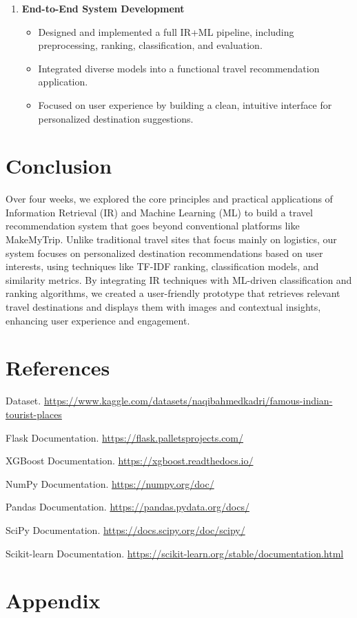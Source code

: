 \documentclass[12pt,a4paper]{report}
\begin{document}
\begin{enumerate}
    \item \textbf{End-to-End System Development}
    \begin{itemize}
        \item Designed and implemented a full IR+ML pipeline, including preprocessing, ranking, classification, and evaluation.
        \item Integrated diverse models into a functional travel recommendation application.
        \item Focused on user experience by building a clean, intuitive interface for personalized destination suggestions.
    \end{itemize}
\end{enumerate}

\newpage
\section{Conclusion}
Over four weeks, we explored the core principles and practical applications of Information Retrieval (IR) and Machine Learning (ML) to build a travel recommendation system that goes beyond conventional platforms like MakeMyTrip. Unlike traditional travel sites that focus mainly on logistics, our system focuses on personalized destination recommendations based on user interests, using techniques like TF-IDF ranking, classification models, and similarity metrics. By integrating IR techniques with ML-driven classification and ranking algorithms, we created a user-friendly prototype that retrieves relevant travel destinations and displays them with images and contextual insights, enhancing user experience and engagement.

\newpage
\section{References}
\begin{thebibliography}{6}

Dataset. \url{https://www.kaggle.com/datasets/naqibahmedkadri/famous-indian-tourist-places}

Flask Documentation. \url{https://flask.palletsprojects.com/}

XGBoost Documentation. \url{https://xgboost.readthedocs.io/}

NumPy Documentation. \url{https://numpy.org/doc/}

Pandas Documentation. \url{https://pandas.pydata.org/docs/}

SciPy Documentation. \url{https://docs.scipy.org/doc/scipy/}

Scikit-learn Documentation. \url{https://scikit-learn.org/stable/documentation.html}

\end{thebibliography}

\section{Appendix}
\end{document}
